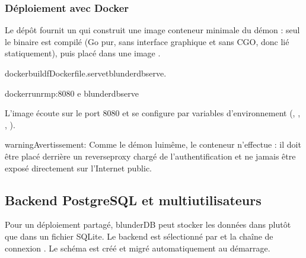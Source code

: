 \documentclass[letterpaper,10pt,french]{sphinxmanual}
\begin{document}
\subsubsection{Déploiement avec Docker}
\label{\detokenize{mode_headless:deploiement-avec-docker}}\label{\detokenize{mode_headless:headless-docker}}
\sphinxAtStartPar
Le dépôt fournit un  qui construit une image conteneur
minimale du démon : seul le binaire  est compilé (Go pur, sans
interface graphique et sans CGO, donc lié statiquement), puis placé dans une
image .

\begin{sphinxVerbatim}[commandchars=\\\{\}]
dockerbuild\PYGZhy{}fDockerfile.serve\PYGZhy{}tblunderdb\PYGZhy{}serve.

dockerrun\PYGZhy{}\PYGZhy{}rm\PYGZhy{}p:8080
\PYGZhy{}e
blunderdb\PYGZhy{}serve
\end{sphinxVerbatim}

\sphinxAtStartPar
L’image écoute sur le port 8080 et se configure par variables d’environnement
(, , ,
).

\begin{sphinxadmonition}{warning}{Avertissement:}
\sphinxAtStartPar
Comme le démon lui\sphinxhyphen{}même, le conteneur n’effectue  : il doit être placé derrière un reverse\sphinxhyphen{}proxy chargé de
l’authentification et ne jamais être exposé directement sur l’Internet
public.
\end{sphinxadmonition}


\subsection{Backend PostgreSQL et multi\sphinxhyphen{}utilisateurs}
\label{\detokenize{mode_headless:backend-postgresql-et-multi-utilisateurs}}\label{\detokenize{mode_headless:headless-postgres}}
\sphinxAtStartPar
Pour un déploiement partagé, blunderDB peut stocker les données dans
 plutôt que dans un fichier SQLite. Le backend est sélectionné
par  et la chaîne de connexion . Le schéma est
créé et migré automatiquement au démarrage.
\end{document}

